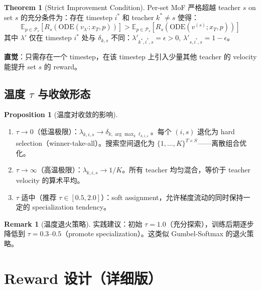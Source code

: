 \documentclass[11pt,a4paper]{article}
\newcommand{\E}{\mathbb{E}}
\newcommand{\reward}{R}
\theoremstyle{definition}
\newtheorem{remark}{Remark}
\newtheorem{proposition}{Proposition}
\newtheorem{theorem}{Theorem}
\begin{document}
\begin{theorem}[Strict Improvement Condition]
\label{thm:strict_improve}
Per-set MoF 严格超越 teacher $s$ on set $s$ 的充分条件为：存在 timestep $i^*$ 和 teacher $k^* \neq s$ 使得：
\begin{equation}
\E_{p \in \mathcal{P}_s}\left[\reward_s\!\left(\mathrm{ODE}(v_{\lambda'}; x_T, p)\right)\right] > \E_{p \in \mathcal{P}_s}\left[\reward_s\!\left(\mathrm{ODE}(v^{(s)}; x_T, p)\right)\right]
\end{equation}
其中 $\lambda'$ 仅在 timestep $i^*$ 处与 $\delta_{k,s}$ 不同：$\lambda'_{k^*,i^*,s} = \epsilon > 0$, $\lambda'_{s,i^*,s} = 1 - \epsilon$。

\textbf{直觉}：只需存在一个 timestep，在该 timestep 上引入少量其他 teacher 的 velocity 能提升 set $s$ 的 reward。
\end{theorem}

\subsection{温度 $\tau$ 与收敛形态}

\begin{proposition}[温度对收敛的影响]
\label{prop:temperature}
\begin{enumerate}[leftmargin=1.5em]
\item $\tau \to 0$（低温极限）：$\lambda_{k,i,s} \to \delta_{k, \arg\max_k \ell_{k,i,s}}$。每个 $(i,s)$ 退化为 hard selection（winner-take-all）。搜索空间退化为 $\{1,\ldots,K\}^{T \times S}$——离散组合优化。

\item $\tau \to \infty$（高温极限）：$\lambda_{k,i,s} \to 1/K$。所有 teacher 均匀混合，等价于 teacher velocity 的算术平均。

\item $\tau$ 适中（推荐 $\tau \in [0.5, 2.0]$）：soft assignment，允许梯度流动的同时保持一定的 specialization tendency。
\end{enumerate}
\end{proposition}

\begin{remark}[温度退火策略]
实践建议：初始 $\tau = 1.0$（充分探索），训练后期逐步降低到 $\tau = 0.3$--$0.5$（promote specialization）。这类似 Gumbel-Softmax 的退火策略。
\end{remark}

\section{Reward 设计（详细版）}
\label{sec:reward}
\end{document}
